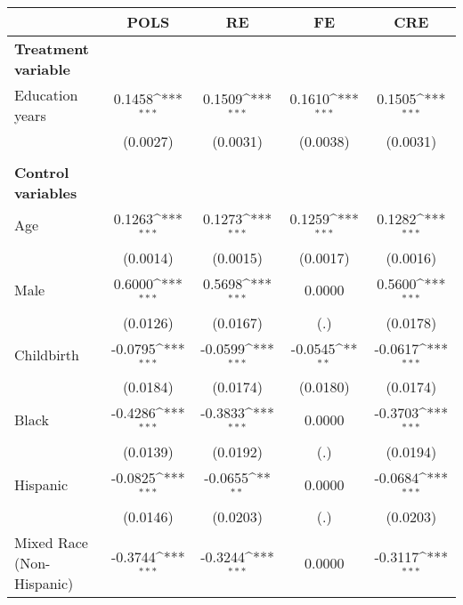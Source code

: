 {
\def\sym#1{\ifmmode^{#1}\else\(^{#1}\)\fi}
\begin{tabular}{l*{4}{c}}
\toprule
                    &\multicolumn{1}{c}{POLS}&\multicolumn{1}{c}{RE}&\multicolumn{1}{c}{FE}&\multicolumn{1}{c}{CRE}\\
\midrule
\textbf{Treatment variable}&                     &                     &                     &                     \\
Education years     &      0.1458\sym{***}&      0.1509\sym{***}&      0.1610\sym{***}&      0.1505\sym{***}\\
                    &    (0.0027)         &    (0.0031)         &    (0.0038)         &    (0.0031)         \\
\\ \textbf{Control variables}&                     &                     &                     &                     \\
Age                 &      0.1263\sym{***}&      0.1273\sym{***}&      0.1259\sym{***}&      0.1282\sym{***}\\
                    &    (0.0014)         &    (0.0015)         &    (0.0017)         &    (0.0016)         \\
Male                &      0.6000\sym{***}&      0.5698\sym{***}&      0.0000         &      0.5600\sym{***}\\
                    &    (0.0126)         &    (0.0167)         &         (.)         &    (0.0178)         \\
Childbirth          &     -0.0795\sym{***}&     -0.0599\sym{***}&     -0.0545\sym{**} &     -0.0617\sym{***}\\
                    &    (0.0184)         &    (0.0174)         &    (0.0180)         &    (0.0174)         \\
Black               &     -0.4286\sym{***}&     -0.3833\sym{***}&      0.0000         &     -0.3703\sym{***}\\
                    &    (0.0139)         &    (0.0192)         &         (.)         &    (0.0194)         \\
Hispanic            &     -0.0825\sym{***}&     -0.0655\sym{**} &      0.0000         &     -0.0684\sym{***}\\
                    &    (0.0146)         &    (0.0203)         &         (.)         &    (0.0203)         \\
Mixed Race (Non-Hispanic)&     -0.3744\sym{***}&     -0.3244\sym{***}&      0.0000         &     -0.3117\sym{***}\\

\end{tabular}}
